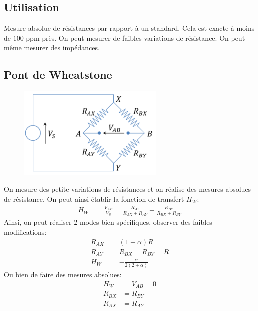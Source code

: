 \documentclass{report}
\begin{document}
\subsection{Utilisation}
Mesure absolue de résistances par rapport à un standard. Cela est exacte à moins de $100$ ppm près. On peut mesurer de faibles variations de résistance. On peut même mesurer des impédances.

\subsection{Pont de Wheatstone}
\begin{figure}
\centering
\includegraphics[width=7cm]{img/Wheatstone.png}
\end{figure}
On mesure des petite variations de résistances et on
 réalise des mesures absolues de résistance. On peut ainsi établir la fonction de transfert $H_W$:
\begin{align*}
H_W &= \frac{V_{AB}}{V_S} = \frac{R_{AY}}{R_{AX} + R_{AY}} - \frac{R_{BY}}{R_{BX} + R_{BY}}
\end{align*}
Ainsi, on peut réaliser 2 modes bien spécifiques, observer des faibles modifications:
\begin{align*}
R_{AX} &= (1 + \alpha) R\\
R_{AY} &= R_{BX} = R_{BY} = R\\
H_W &= - \frac{\alpha}{2(2+\alpha)}
\end{align*}
Ou bien de faire des mesures absolues:
\begin{align*}
H_W &= V_{AB} = 0\\
R_{BX} &= R_{BY}\\
R_{AX} &= R_{AY}
\end{align*}
\end{document}
